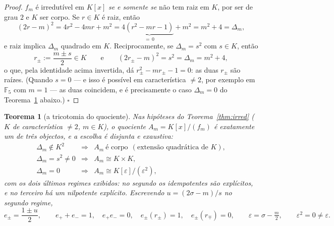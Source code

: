 \documentclass[11pt,a4paper]{article}
\newtheorem{teorema}{Teorema}
\begin{document}
\begin{proof}
$f_m$ é irredutível em $K[x]$ \emph{se e somente se} não tem raiz em $K$, por ser de grau
$2$ e $K$ ser corpo. Se $r\in K$ é raiz, então
\[
(2r-m)^{2}
=
4r^{2}-4mr+m^{2}
=
4\underbrace{(r^{2}-mr-1)}_{=\,0}+m^{2}
=
m^{2}+4
=
\Delta_m,
\]
e raiz implica $\Delta_m$ quadrado em $K$. Reciprocamente, se $\Delta_m=s^{2}$ com $s\in K$,
então
\[
r_{\pm}:=\frac{m\pm s}{2}\in K
\qquad\text{e}\qquad
(2r_{\pm}-m)^{2}=s^{2}=\Delta_m=m^{2}+4,
\]
o que, pela identidade acima invertida, dá $r_{\pm}^{2}-mr_{\pm}-1=0$: as duas $r_{\pm}$
são raízes. (Quando $s=0$ --- e isso é possível em característica $\neq2$, por exemplo em
$\mathbb{F}_5$ com $m=1$ --- as duas coincidem, e é precisamente o caso $\Delta_m=0$ do
Teorema~\ref{thm:tricot} abaixo.) $\square$
\end{proof}

\begin{teorema}[a tricotomia do quociente]\label{thm:tricot}
Nas hipóteses do Teorema~\ref{thm:irred} ($K$ de característica $\neq2$, $m\in K$), o
quociente $A_m=K[x]/(f_m)$ é \emph{exatamente um} de três objectos, e a escolha é
disjunta e exaustiva:
\[
\boxed{
\begin{array}{ccl}
\Delta_m\notin K^{2} &\Longrightarrow& A_m\ \text{é corpo}\ \ (\text{extensão quadrática de }K),\\[0.3em]
\Delta_m=s^{2}\neq0 &\Longrightarrow& A_m\cong K\times K,\\[0.3em]
\Delta_m=0 &\Longrightarrow& A_m\cong K[\varepsilon]/(\varepsilon^{2}),
\end{array}}
\]
com os dois últimos regimes \emph{exibidos}: no segundo os idempotentes são explícitos, e
no terceiro há um nilpotente explícito. Escrevendo $u=(2\sigma-m)/s$ no segundo regime,
\[
\boxed{
e_{\pm}=\frac{1\pm u}{2},\qquad
e_{+}+e_{-}=1,\quad e_{+}e_{-}=0,\quad
e_{\pm}(r_{\pm})=1,\quad e_{\pm}(r_{\mp})=0,
}
\qquad
\boxed{\varepsilon=\sigma-\tfrac m2,\qquad \varepsilon^{2}=0\neq\varepsilon.}
\]
\end{teorema}
\end{document}
